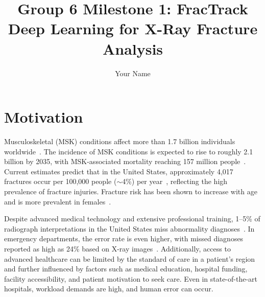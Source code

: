 \documentclass[conference]{IEEEtran}
\begin{document}
\title{Group 6 Milestone 1: FracTrack\\[0.5em] 
       \large Deep Learning for X-Ray Fracture Analysis}
\author{Your Name}
\author{
\and
{}
\and
{}
\and
{}
}

\maketitle



\section{Motivation}

Musculoskeletal (MSK) conditions affect more than 1.7 billion individuals worldwide~\cite{usbji2014bmus}. The incidence of MSK conditions is expected to rise to roughly 2.1 billion by 2035, with MSK-associated mortality reaching 157 million people~\cite{liu2025_global_msk}. Current estimates predict that in the United States, approximately 4{,}017 fractures occur per 100{,}000 people ($\sim$4\%) per year~\cite{amin2014_trends_fracture}, reflecting the high prevalence of fracture injuries. Fracture risk has been shown to increase with age and is more prevalent in females~\cite{amin2014_trends_fracture}.

Despite advanced medical technology and extensive professional training, 1--5\% of radiograph interpretations in the United States miss abnormality diagnoses~\cite{zech2022ai_fracture,newman_toker2022_diag_errors}. In emergency departments, the error rate is even higher, with missed diagnoses reported as high as 24\% based on X-ray images~\cite{qin2026enhanced_fracture_detection}. Additionally, access to advanced healthcare can be limited by the standard of care in a patient's region and further influenced by factors such as medical education, hospital funding, facility accessibility, and patient motivation to seek care. Even in state-of-the-art hospitals, workload demands are high, and human error can occur.
\end{document}
